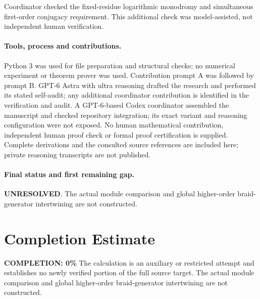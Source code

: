 \documentclass[11pt]{article}
\begin{document}
Coordinator checked the fixed-residue logarithmic monodromy and simultaneous first-order conjugacy requirement. This additional check was model-assisted, not independent human verification.

\paragraph{Tools, process and contributions.}
Python 3 was used for file preparation and structural checks; no numerical experiment or theorem prover was used. Contribution prompt A was followed by prompt B. GPT-6 Astra with ultra reasoning drafted the research and performed its stated self-audit; any additional coordinator contribution is identified in the verification and audit. A GPT-6-based Codex coordinator assembled the manuscript and checked repository integration; its exact variant and reasoning configuration were not exposed. No human mathematical contribution, independent human proof check or formal proof certification is supplied. Complete derivations and the consulted source references are included here; private reasoning transcripts are not published.

\paragraph{Final status and first remaining gap.}
\textbf{UNRESOLVED}. The actual module comparison and global higher-order braid-generator intertwining are not constructed.

\section{Completion Estimate}
\noindent\textbf{COMPLETION: 0\%}
The calculation is an auxiliary or restricted attempt and establishes no newly verified portion of the full source target. The actual module comparison and global higher-order braid-generator intertwining are not constructed.
\end{document}
